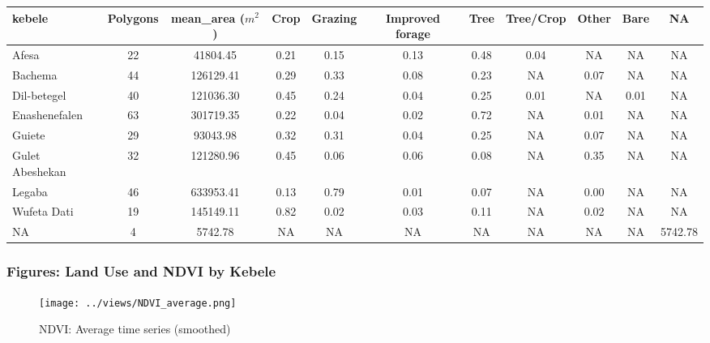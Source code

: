 \documentclass[10pt,a4paper,onecolumn]{article}
\begin{document}
\begin{table}[H]
\scriptsize
\begin{tabular}{lcccccccccc}
\toprule
kebele          & Polygons & mean\_area ($m^2$) & Crop    & Grazing & Improved forage & Tree    & Tree/Crop & Other   & Bare   & NA          \\
\midrule
Afesa           & 22       & 41804.45   & 0.21 & 0.15    & 0.13            & 0.48 & 0.04      & NA    & NA   & NA      \\
Bachema         & 44       & 126129.41  & 0.29 & 0.33    & 0.08            & 0.23 & NA        & 0.07  & NA   & NA      \\
Dil-betegel     & 40       & 121036.30  & 0.45 & 0.24    & 0.04            & 0.25 & 0.01      & NA    & 0.01 & NA      \\
Enashenefalen   & 63       & 301719.35  & 0.22 & 0.04    & 0.02            & 0.72 & NA        & 0.01  & NA   & NA      \\
Guiete          & 29       & 93043.98   & 0.32 & 0.31    & 0.04            & 0.25 & NA        & 0.07  & NA   & NA      \\
Gulet Abeshekan & 32       & 121280.96  & 0.45 & 0.06    & 0.06            & 0.08 & NA        & 0.35  & NA   & NA      \\
Legaba          & 46       & 633953.41  & 0.13 & 0.79    & 0.01            & 0.07 & NA        & 0.00  & NA   & NA      \\
Wufeta Dati     & 19       & 145149.11  & 0.82 & 0.02    & 0.03            & 0.11 & NA        & 0.02  & NA   & NA      \\
NA              & 4        & 5742.78    & NA   & NA      & NA              & NA   & NA        & NA    & NA   & 5742.78  \\

\bottomrule
\end{tabular}
\end{table}




\pagebreak

\subsubsection{Figures: Land Use and NDVI by Kebele }


\begin{figure}[H] \centering
  \captionsetup{justification=centering}
\caption{NDVI: Average time series (smoothed)} 
\centering


\texttt{[image: ../views/NDVI\_average.png]}

\end{figure}
\end{document}
